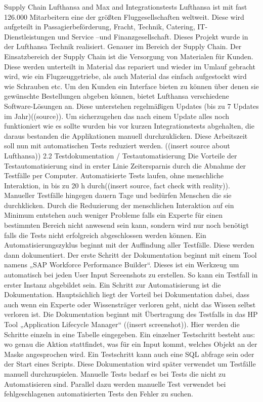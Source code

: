 Supply Chain Lufthansa and Max and Integrationstests
Lufthansa ist mit fast 126.000 Mitarbeitern eine der größten Fluggesellschaften weltweit. Diese wird aufgeteilt in Passagierbeförderung, Fracht, Technik, Catering, IT- Dienstleistungen und Service –und Finanzgesellschaft. Dieses Projekt wurde in der Lufthansa Technik realisiert. Genauer im Bereich der Supply Chain. Der Einsatzbereich der Supply Chain ist die Versorgung von Materialen für Kunden. Diese werden unterteilt in Material das repariert und wieder im Umlauf gebracht wird, wie ein Flugzeuggetriebe, als auch Material das einfach aufgestockt wird wie Schrauben etc.
Um den Kunden ein Interface bieten zu können über denen sie gewünschte Bestellungen abgeben können, bietet Lufthansa verschiedene Software-Lösungen an. Diese unterstehen regelmäßigen Updates (bis zu 7 Updates im Jahr)((source)). Um sicherzugehen das nach einem Update alles noch funktioniert wie es sollte wurden bis vor kurzen Integrationstests abgehalten, die daraus bestanden die Applikationen manuell durchzuklicken. Diese Arbeitszeit soll nun mit automatischen Tests reduziert  werden. ((insert source about Lufthansa))
2.2 Testdokumentation  / Testautomatisierung 
Die Vorteile der Testautomatisierung sind in erster Linie Zeitersparnis durch die Abnahme der Testfälle per Computer. Automatisierte Tests laufen, ohne menschliche Interaktion,  in bis zu 20 h durch((insert source, fact check with reality)). Manueller Testfälle hingegen dauern Tage und bedürfen Menschen die sie durchklicken. Durch die Reduzierung der menschlichen Interaktion auf ein Minimum entstehen auch weniger Probleme falls ein Experte für einen bestimmten Bereich nicht anwesend sein kann, sondern wird nur noch benötigt falls die Tests nicht erfolgreich abgeschlossen werden können. 
Ein Automatisierungszyklus beginnt mit der Auffindung aller Testfälle. Diese werden dann dokumentiert. Der erste Schritt der Dokumentation beginnt mit einem Tool namens „SAP Workforce Performance Builder“. Dieses ist ein Werkzeug um automatisch bei jeden User Input Screenshots  zu erstellen. So kann ein Testfall in erster Instanz abgebildet sein.
Ein Schritt zur Automatisierung ist die  Dokumentation. Hauptsächlich liegt der Vorteil bei Dokumentation dabei, dass auch wenn ein Experte oder Wissensträger verloren geht, nicht das Wissen selbst verloren ist.
Die Dokumentation beginnt mit Übertragung des Testfalls in das HP Tool „Application Lifecycle Manager“ ((insert screenshot)). Hier werden die Schritte einzeln in eine Tabelle eingegeben. Ein einzelner Testschritt besteht aus: wo genau die Aktion stattfindet, was für ein Input kommt, welches Objekt an der Maske angesprochen wird. Ein Testschritt kann auch eine SQL abfrage sein oder der 
Start eines Scripts. Diese Dokumentation wird später verwendet um Testfälle manuell durchzuspielen. 
Manuelle Tests bedarf es bei Tests die nicht zu Automatisieren sind. Parallel dazu werden manuelle Test verwendet bei fehlgeschlagenen automatisierten Tests den Fehler zu suchen.                                                                                             
 
